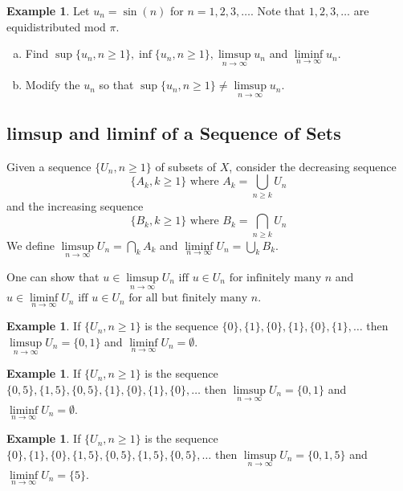 \documentclass[12pt]{amsart}
\theoremstyle{definition}
\newtheorem{example}[theorem]{Example}
\begin{document}
\begin{example} Let $u_n = \sin(n)$ for $n = 1, 2, 3, \dots$. Note that $1, 2, 3, \dots$ are equidistributed mod $\pi$.
\begin{enumerate}[a.]
\item Find $\sup \{u_n, n \geq 1\}, \inf \{u_n, n \geq 1\}, \limsup\limits_{n \to \infty} u_n$ and $\liminf\limits_{n \to \infty} u_n$.
\item Modify the $u_n$ so that $\sup \{u_n, n \geq 1\} \neq \limsup\limits_{n \to \infty} u_n$.
\end{enumerate}
\end{example}
\vspace{10pt}

\subsection{limsup and liminf of a Sequence of Sets} Given a sequence $\{U_n, n \geq 1\}$ of subsets of $X$, consider the decreasing sequence
$$\{A_k, k \geq 1\} \text{ where } A_k = \bigcup\limits_{n \geq k} U_n$$
and the increasing sequence
$$\{B_k, k \geq 1\} \text{ where } B_k = \bigcap\limits_{n \geq k} U_n$$
\dfn We define $\limsup\limits_{n \to \infty} U_n = \bigcap\limits_k A_k$ and $\liminf\limits_{n \to \infty} U_n = \bigcup\limits_k B_k$.

One can show that $u \in \limsup\limits_{n \to \infty} U_n \text{ iff } u \in U_n \text{ for infinitely many } n$ and $u \in \liminf\limits_{n \to \infty} U_n \text{ iff } u \in U_n \text{ for all but finitely many } n$.

\begin{example} If $\{U_n, n \geq 1\}$ is the sequence $\{0\}, \{1\}, \{0\}, \{1\}, \{0\}, \{1\}, \dots$ then $\limsup\limits_{n \to \infty} U_n = \{0, 1\}$ and $\liminf\limits_{n \to \infty} U_n = \emptyset$.
\end{example}

\begin{example} If $\{U_n, n \geq 1\}$ is the sequence $\{0, 5\}, \{1, 5\}, \{0, 5\}, \{1\}, \{0\}, \{1\}, \{0\}, \dots$ then $\limsup\limits_{n \to \infty} U_n = \{0, 1\}$ and $\liminf\limits_{n \to \infty} U_n = \emptyset$.
\end{example}

\begin{example} If $\{U_n, n \geq 1\}$ is the sequence $\{0\}, \{1\}, \{0\}, \{1, 5\}, \{0, 5\}, \{1, 5\}, \{0,5\}, \dots$ then $\limsup\limits_{n \to \infty} U_n = \{0, 1, 5\}$ and $\liminf\limits_{n \to \infty} U_n = \{5\}$.
\end{example}
\end{document}
